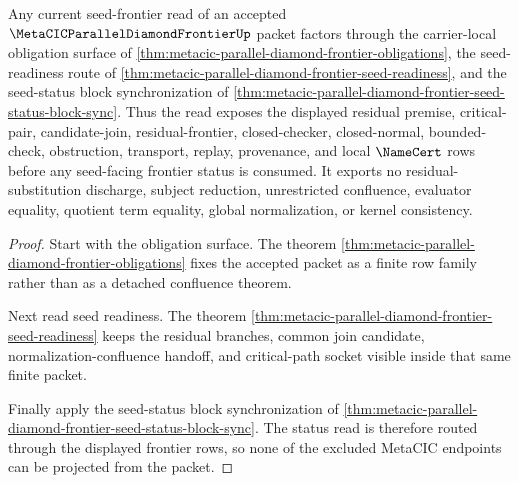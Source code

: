 \begin{theorem}
\label{thm:metacic-parallel-diamond-frontier-current-seed-frontier-reader}
Any current seed-frontier read of an accepted $\MetaCICParallelDiamondFrontierUp$ packet factors through the carrier-local obligation surface of \autoref{thm:metacic-parallel-diamond-frontier-obligations}, the seed-readiness route of \autoref{thm:metacic-parallel-diamond-frontier-seed-readiness}, and the seed-status block synchronization of \autoref{thm:metacic-parallel-diamond-frontier-seed-status-block-sync}. Thus the read exposes the displayed residual premise, critical-pair, candidate-join, residual-frontier, closed-checker, closed-normal, bounded-check, obstruction, transport, replay, provenance, and local $\NameCert$ rows before any seed-facing frontier status is consumed. It exports no residual-substitution discharge, subject reduction, unrestricted confluence, evaluator equality, quotient term equality, global normalization, or kernel consistency.
\end{theorem}
\begin{proof}
Start with the obligation surface. The theorem \autoref{thm:metacic-parallel-diamond-frontier-obligations} fixes the accepted packet as a finite row family rather than as a detached confluence theorem.

Next read seed readiness. The theorem \autoref{thm:metacic-parallel-diamond-frontier-seed-readiness} keeps the residual branches, common join candidate, normalization-confluence handoff, and critical-path socket visible inside that same finite packet.

Finally apply the seed-status block synchronization of \autoref{thm:metacic-parallel-diamond-frontier-seed-status-block-sync}. The status read is therefore routed through the displayed frontier rows, so none of the excluded MetaCIC endpoints can be projected from the packet.
\end{proof}
